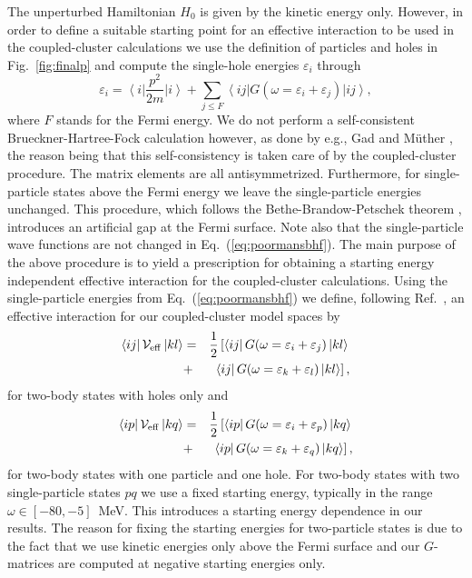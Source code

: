 \documentclass[aps,prc,twocolumn,floatfix]{revtex4}
\begin{document}
The unperturbed Hamiltonian $H_0$ is given by  the kinetic energy only.
However, in order to define a suitable starting point for 
an effective interaction to be used
in the coupled-cluster calculations we use the 
definition of particles and holes in 
Fig.~\ref{fig:finalp} and compute the single-hole energies $\varepsilon_i$ through 
\begin{equation}    \label{eq:poormansbhf}
  \varepsilon_i = \left\langle i\right | \frac{p^2}{2m} \left | i \right \rangle +\sum_{j \leq F}  \left\langle ij\right | G(\omega=\varepsilon_i+\varepsilon_j) \left | ij\right\rangle, 
\end{equation}
where $F$ stands for the Fermi energy. We do not perform a self-consistent Brueckner-Hartree-Fock 
calculation however, as done by e.g., Gad and M\"uther \cite{herbert02}, the reason being that
this self-consistency is taken care of by the coupled-cluster procedure.
The matrix elements are all
antisymmetrized.
Furthermore, for single-particle states above the Fermi energy we leave the single-particle energies
unchanged. This procedure, which follows the Bethe-Brandow-Petschek theorem \cite{bbp63}, 
introduces an artificial gap at the Fermi surface. 
Note also that the single-particle wave functions are not changed in Eq.~(\ref{eq:poormansbhf}). 
The main purpose of the above procedure is to yield a 
prescription for obtaining
a starting energy independent effective interaction 
for the coupled-cluster 
calculations. Using the single-particle energies from 
Eq.~(\ref{eq:poormansbhf}) 
we define, following Ref.~\cite{herbert02}, an effective
interaction for our coupled-cluster model spaces by 
\begin{eqnarray}
    \left\langle ij \right | {\cal V}_{\mathrm{eff}} \left |
kl \right\rangle
&=& \frac{1}{2} \left[ \left\langle ij \right |
G(\omega=\varepsilon_i+\varepsilon_j) \left | kl \right\rangle \right. 
\nonumber \\ 
&+&  \left.\left\langle ij\right | 
G(\omega=\varepsilon_k+\varepsilon_l) \left |  kl\right\rangle \right], 
\label{eq:gmat1approx}
\end{eqnarray}
for two-body states with holes only and 
\begin{eqnarray}
    \left\langle ip \right | {\cal V}_{\mathrm{eff}}\left | kq \right\rangle 
&=& \frac{1}{2}\left[ \left\langle ip \right | G(\omega=\varepsilon_i
+\varepsilon_p) \left | kq \right\rangle \right. \nonumber \\
&+& \left. \left\langle ip \right | G(\omega=\varepsilon_k+\varepsilon_q) 
\left | kq \right\rangle \right], 
\label{eq:gmat2approx}
\end{eqnarray}
for two-body states with one particle and one hole. For two-body states with two single-particle
states $pq$ we use a fixed starting energy, typically in the range $\omega \in [-80,-5]$~MeV. 
This introduces a starting energy 
dependence in our results. The reason for fixing the starting
energies for two-particle states is due to the fact that we use kinetic energies only above the
Fermi surface and our $G$-matrices are computed at negative starting energies only.
\end{document}
